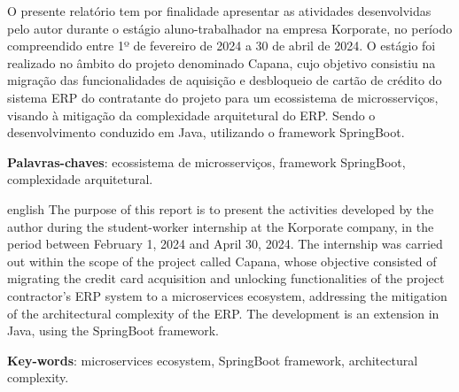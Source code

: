\setlength{\absparsep}{18pt} %
\begin{resumo}
	
  O presente relatório tem por finalidade apresentar as atividades desenvolvidas pelo 
  autor durante o estágio aluno-trabalhador na empresa Korporate, no período 
  compreendido entre 1º de fevereiro de 2024 a 30 de abril de 2024. O estágio foi 
  realizado no âmbito do projeto denominado Capana, cujo objetivo consistiu na 
  migração das funcionalidades de aquisição e desbloqueio de cartão de crédito do 
  sistema ERP do contratante do projeto para um ecossistema de microsserviços, 
  visando à mitigação da complexidade arquitetural do ERP. Sendo o desenvolvimento 
  conduzido em Java, utilizando o framework SpringBoot.  

    
	\vspace{\onelineskip}
 
	\noindent 
	\textbf{Palavras-chaves}:  ecossistema de microsserviços, framework SpringBoot, complexidade arquitetural. 
\end{resumo}

\begin{resumo}[Abstract]
\begin{otherlanguage*}{english}
  The purpose of this report is to present the activities developed by the author 
  during the student-worker internship at the Korporate company, in the period between 
  February 1, 2024 and April 30, 2024. The internship was carried out within the 
  scope of the project called Capana, whose objective consisted of migrating the 
  credit card acquisition and unlocking functionalities of the project contractor's 
  ERP system to a microservices ecosystem, addressing the mitigation of the 
  architectural complexity of the ERP. The development is an extension in Java, using 
  the SpringBoot framework.
 
	\vspace{\onelineskip}
 
	\noindent 
	\textbf{Key-words}: microservices ecosystem, SpringBoot framework, architectural complexity.
\end{otherlanguage*}
\end{resumo}

